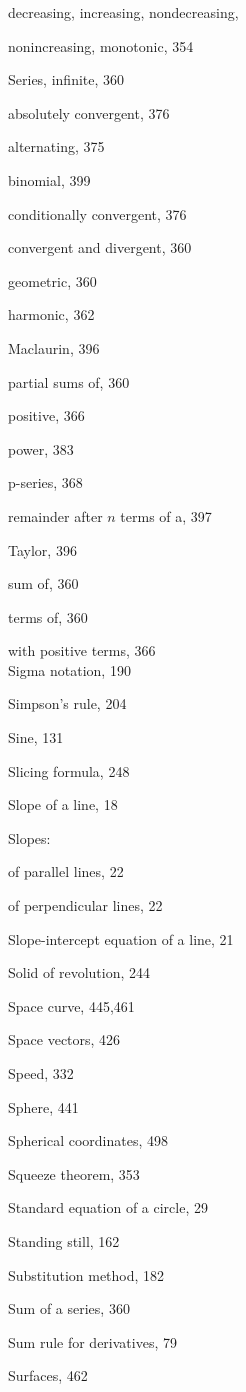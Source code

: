 \documentclass[10pt]{article}
\begin{document}
decreasing, increasing, nondecreasing,

nonincreasing, monotonic, 354

Series, infinite, 360

absolutely convergent, 376

alternating, 375

binomial, 399

conditionally convergent, 376

convergent and divergent, 360

geometric, 360

harmonic, 362

Maclaurin, 396

partial sums of, 360

positive, 366

power, 383

p-series, 368

remainder after $n$ terms of a, 397

Taylor, 396

sum of, 360

terms of, 360

with positive terms, 366\\
Sigma notation, 190

Simpson's rule, 204

Sine, 131

Slicing formula, 248

Slope of a line, 18

Slopes:

of parallel lines, 22

of perpendicular lines, 22

Slope-intercept equation of a line, 21

Solid of revolution, 244

Space curve, 445,461

Space vectors, 426

Speed, 332

Sphere, 441

Spherical coordinates, 498

Squeeze theorem, 353

Standard equation of a circle, 29

Standing still, 162

Substitution method, 182

Sum of a series, 360

Sum rule for derivatives, 79

Surfaces, 462
\end{document}
